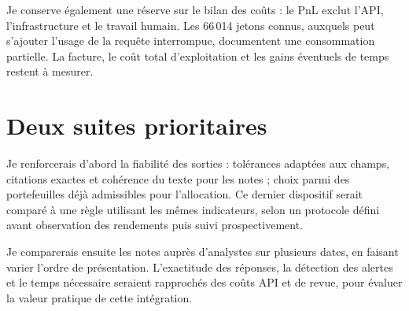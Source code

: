 Je conserve également une réserve sur le bilan des coûts : le PnL exclut l'API, l'infrastructure et le travail humain. Les 66\,014 jetons connus, auxquels peut s'ajouter l'usage de la requête interrompue, documentent une consommation partielle. La facture, le coût total d'exploitation et les gains éventuels de temps restent à mesurer.

\section{Deux suites prioritaires}

Je renforcerais d'abord la fiabilité des sorties : tolérances adaptées aux champs, citations exactes et cohérence du texte pour les notes ; choix parmi des portefeuilles déjà admissibles pour l'allocation. Ce dernier dispositif serait comparé à une règle utilisant les mêmes indicateurs, selon un protocole défini avant observation des rendements puis suivi prospectivement.

Je comparerais ensuite les notes auprès d'analystes sur plusieurs dates, en faisant varier l'ordre de présentation. L'exactitude des réponses, la détection des alertes et le temps nécessaire seraient rapprochés des coûts API et de revue, pour évaluer la valeur pratique de cette intégration.
